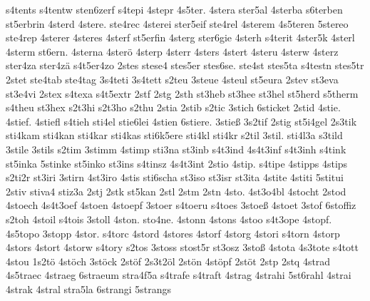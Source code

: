 {    s4tents
    s4tentw
    sten6zerf
    s4tepi
    4stepr
    4s5ter.
    4stera
    ster5al
    4sterba
    s6terben
    st5erbrin
    4sterd
    4stere.
    ste4rec
    4sterei
    ster5eif
    ste4rel
    4sterem
    4s5teren
    5stereo
    ste4rep
    4sterer
    4steres
    4sterf
    st5erfin
    4sterg
    ster6gie
    4sterh
    s4terit
    4ster5k
    4sterl
    4sterm
    st6ern.
    4sterna
    4sterö
    4sterp
    4sterr
    4sters
    4stert
    4steru
    4sterw
    4sterz
    ster4za
    ster4zä
    s4t5er4zo
    2stes
    stese4
    stes5er
    stes6se.
    ste4st
    stes5ta
    s4testn
    stes5tr
    2stet
    ste4tab
    ste4tag
    3s4teti
    3s4tett
    s2teu
    3steue
    4steul
    st5eura
    2stev
    st3eva
    st3e4vi
    2stex
    s4texa
    s4t5extr
    2stf
    2stg
    2sth
    st3heb
    st3hee
    st3hel
    st5herd
    s5therm
    s4theu
    st3hex
    s2t3hi
    s2t3ho
    s2thu
    2stia
    2stib
    s2tic
    3stich
    6sticket
    2stid
    4stie.
    4stief.
    4stiefl
    s4tieh
    sti4el
    stie6lei
    4stien
    6stiere.
    3stieß
    3s2tif
    2stig
    st5i4gel
    2s3tik
    sti4kam
    sti4kan
    sti4kar
    sti4kas
    sti6k5ere
    sti4kl
    sti4kr
    s2til
    3stil.
    sti4l3a
    s3tild
    3stile
    3stils
    s2tim
    3stimm
    4stimp
    sti3na
    st3inb
    s4t3ind
    4s4t3inf
    s4t3inh
    s4tink
    st5inka
    5stinke
    st5inko
    st3ins
    s4tinsz
    4s4t3int
    2stio
    4stip.
    s4tipe
    4stipps
    4stips
    s2ti2r
    st3iri
    3stirn
    4st3iro
    4stis
    sti6scha
    st3iso
    st3isr
    st3ita
    4stite
    4stiti
    5stitui
    2stiv
    stiva4
    stiz3a
    2stj
    2stk
    st5kan
    2stl
    2stm
    2stn
    4sto.
    4st3o4bl
    4stocht
    2stod
    4stoech
    4s4t3oef
    4stoen
    4stoepf
    3stoer
    s4toeru
    s4toes
    3stoeß
    4stoet
    3stof
    6stoffiz
    s2toh
    4stoil
    s4tois
    3stoll
    4ston.
    sto4ne.
    4stonn
    4stons
    4stoo
    s4t3ope
    4stopf.
    4s5topo
    3stopp
    4stor.
    s4torc
    4stord
    4stores
    4storf
    4storg
    4stori
    s4torn
    4storp
    4stors
    4stort
    4storw
    s4tory
    s2tos
    3stoss
    stost5r
    st3osz
    3stoß
    4stota
    4s3tote
    s4tott
    4stou
    1s2tö
    4stöch
    3stöck
    2stöf
    2s3t2öl
    2stön
    4stöpf
    2stöt
    2stp
    2stq
    4strad
    4s5traec
    4straeg
    6straeum
    stra4f5a
    s4trafe
    s4traft
    4strag
    4strahi
    5st6rahl
    4strai
    4strak
    4stral
    stra5la
    6strangi
    5strangs
}
